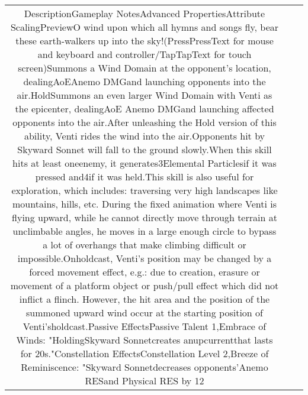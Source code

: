 \documentclass[a4paper,12pt]{article}
\begin{document}
\begin{tabular}{|c|c|c|}
DescriptionGameplay NotesAdvanced PropertiesAttribute ScalingPreviewO wind upon which all hymns and songs fly, bear these earth-walkers up into the sky!(PressPressText for mouse and keyboard and controller/TapTapText for touch screen)Summons a Wind Domain at the opponent's location, dealingAoEAnemo DMGand launching opponents into the air.HoldSummons an even larger Wind Domain with Venti as the epicenter, dealingAoE Anemo DMGand launching affected opponents into the air.After unleashing the Hold version of this ability, Venti rides the wind into the air.Opponents hit by Skyward Sonnet will fall to the ground slowly.When this skill hits at least oneenemy, it generates3Elemental Particlesif it was pressed and4if it was held.This skill is also useful for exploration, which includes: traversing very high landscapes like mountains, hills, etc. During the fixed animation where Venti is flying upward, while he cannot directly move through terrain at unclimbable angles, he moves in a large enough circle to bypass a lot of overhangs that make climbing difficult or impossible.Onholdcast, Venti's position may be changed by a forced movement effect, e.g.: due to creation, erasure or movement of a platform object or push/pull effect which did not inflict a flinch. However, the hit area and the position of the summoned upward wind occur at the starting position of Venti'sholdcast.Passive EffectsPassive Talent 1,Embrace of Winds: "HoldingSkyward Sonnetcreates anupcurrentthat lasts for 20s."Constellation EffectsConstellation Level 2,Breeze of Reminiscence: "Skyward Sonnetdecreases opponents'Anemo RESand Physical RES by 12%
\end{tabular}
\end{document}

